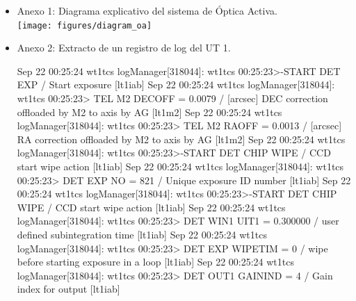 
\begin{itemize}
    \item Anexo 1: Diagrama explicativo del sistema de Óptica Activa.
        \\
        \vspace{3.5cm}
        \texttt{[image: figures/diagram\_oa]} \\
        \vspace{3.5cm}


    \item Anexo 2: Extracto de un registro de log del UT 1.
        \begin{myverbatim}[caption={Plantillas TTP},label={myverbatim:ttp}]
        Sep 22 00:25:24 wt1tcs logManager[318044]: wt1tcs  00:25:23>-START DET EXP / Start exposure [lt1iab]
        Sep 22 00:25:24 wt1tcs logManager[318044]: wt1tcs  00:25:23> TEL M2 DECOFF = 0.0079 / [arcsec] DEC correction offloaded by M2 to axis by AG [lt1m2]
        Sep 22 00:25:24 wt1tcs logManager[318044]: wt1tcs  00:25:23> TEL M2 RAOFF = 0.0013 / [arcsec] RA correction offloaded by M2 to axis by AG [lt1m2]
        Sep 22 00:25:24 wt1tcs logManager[318044]: wt1tcs  00:25:23>-START DET CHIP WIPE / CCD start wipe action [lt1iab]
        Sep 22 00:25:24 wt1tcs logManager[318044]: wt1tcs  00:25:23> DET EXP NO = 821 / Unique exposure ID number [lt1iab]
        Sep 22 00:25:24 wt1tcs logManager[318044]: wt1tcs  00:25:23>-START DET CHIP WIPE / CCD start wipe action [lt1iab]
        Sep 22 00:25:24 wt1tcs logManager[318044]: wt1tcs  00:25:23> DET WIN1 UIT1 = 0.300000 / user defined subintegration time [lt1iab]
        Sep 22 00:25:24 wt1tcs logManager[318044]: wt1tcs  00:25:23> DET EXP WIPETIM = 0 / wipe before starting exposure in a loop [lt1iab]
        Sep 22 00:25:24 wt1tcs logManager[318044]: wt1tcs  00:25:23> DET OUT1 GAININD = 4 / Gain index for output [lt1iab]
    
        \end{myverbatim}


\end{itemize}

